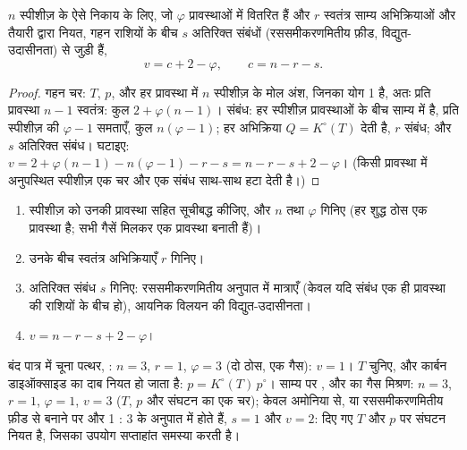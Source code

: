 \begin{theorem}[प्रावस्था नियम]\label{thm:b2:equilibrium-shifts:phase-rule}
$n$ स्पीशीज़ के ऐसे निकाय के लिए, जो $\varphi$ प्रावस्थाओं में वितरित हैं और $r$
स्वतंत्र साम्य अभिक्रियाओं और तैयारी द्वारा नियत, गहन राशियों के बीच $s$
अतिरिक्त संबंधों (रससमीकरणमितीय फ़ीड,
विद्युत-उदासीनता) से जुड़ी हैं,
\[
  v = c + 2 - \varphi, \qquad c = n - r - s .
\]
\end{theorem}

\begin{proof}
गहन चर: $T$, $p$, और हर प्रावस्था में
$n$ स्पीशीज़ के मोल अंश, जिनका योग 1 है, अतः प्रति प्रावस्था $n - 1$ स्वतंत्र: कुल $2 +
\varphi(n - 1)$। संबंध: हर स्पीशीज़ प्रावस्थाओं के बीच साम्य में है,
प्रति स्पीशीज़  की $\varphi - 1$ समताएँ, कुल $n(\varphi -
1)$; हर अभिक्रिया $Q = K^\circ(T)$ देती है, $r$ संबंध; और $s$
अतिरिक्त संबंध। घटाइए: $v = 2 + \varphi(n - 1) - n(\varphi - 1) - r -
s = n - r - s + 2 - \varphi$। (किसी प्रावस्था में अनुपस्थित स्पीशीज़ एक
चर और एक संबंध साथ-साथ हटा देती है।)
\end{proof}

\begin{method}[स्वातंत्र्य कोटि का परिकलन]\label{met:b2:equilibrium-shifts:variance}
\begin{enumerate}
  \item स्पीशीज़ को उनकी प्रावस्था सहित सूचीबद्ध कीजिए, और $n$ तथा $\varphi$ गिनिए
        (हर शुद्ध ठोस एक प्रावस्था है; सभी गैसें मिलकर एक प्रावस्था बनाती हैं)।
  \item उनके बीच स्वतंत्र अभिक्रियाएँ $r$ गिनिए।
  \item अतिरिक्त संबंध $s$ गिनिए: रससमीकरणमितीय अनुपात में मात्राएँ
        (केवल यदि संबंध एक ही प्रावस्था की राशियों के बीच हो),
        आयनिक विलयन की विद्युत-उदासीनता।
  \item $v = n - r - s + 2 - \varphi$।
\end{enumerate}
\end{method}

\begin{example}[तीन स्वातंत्र्य कोटियाँ]\label{ex:b2:equilibrium-shifts:variances}
बंद पात्र में चूना पत्थर, : $n = 3$, $r =
1$, $\varphi = 3$ (दो ठोस, एक गैस): $v = 1$। $T$ चुनिए, और कार्बन डाइऑक्साइड
का दाब नियत हो जाता है: $p = K^\circ(T)\,p^\circ$। साम्य पर
,  और  का गैस मिश्रण: $n = 3$, $r = 1$, $\varphi = 1$, $v
= 3$ ($T$, $p$ और संघटन का एक चर); केवल अमोनिया से, या
रससमीकरणमितीय फ़ीड से बनाने पर  और  1 : 3 के अनुपात में होते हैं, $s = 1$ और
$v = 2$: दिए गए $T$ और $p$ पर संघटन नियत है, जिसका उपयोग सप्ताहांत समस्या
करती है।
\end{example}

